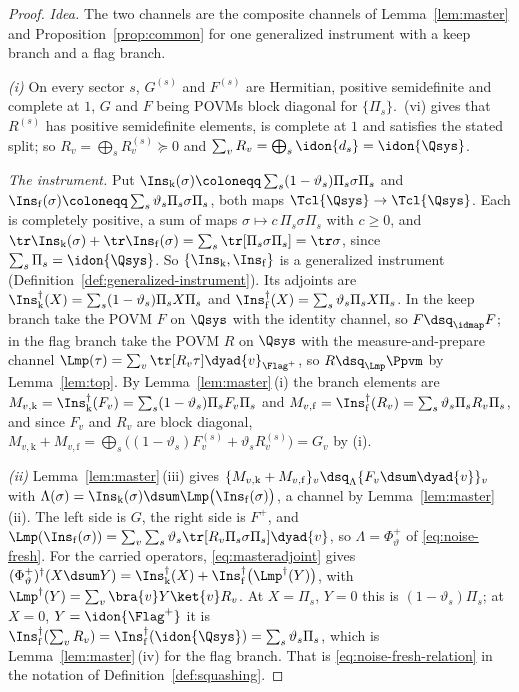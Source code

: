 \begin{proof}
\emph{Idea.} The two channels are the composite channels of
Lemma~\ref{lem:master} and Proposition~\ref{prop:common} for one generalized
instrument with a keep branch and a flag branch.

\emph{(i)} On every sector $s$, $G^{(s)}$ and $F^{(s)}$ are Hermitian, positive
semidefinite and complete at $1$, $G$ and $F$ being POVMs block diagonal for
$\{\Pi_s\}$. \,(vi) gives that $R^{(s)}$ has
positive semidefinite elements, is complete at $1$ and satisfies the stated
split; so $R_v=\bigoplus_sR^{(s)}_v\succeq0$ and
$\sum_vR_v=\bigoplus_s\idon{d_s}=\idon{\Qsys}$.

\emph{The instrument.} Put
$\Ins_{\mathrm{k}}(\sigma)\coloneqq\sum_s(1-\vartheta_s)\Pi_s\sigma\Pi_s$ and
$\Ins_{\mathrm{f}}(\sigma)\coloneqq\sum_s\vartheta_s\Pi_s\sigma\Pi_s$, both maps
$\Tcl{\Qsys}\to\Tcl{\Qsys}$. Each is completely positive, a sum of maps
$\sigma\mapsto c\,\Pi_s\sigma\Pi_s$ with $c\ge0$, and
$\tr\Ins_{\mathrm{k}}(\sigma)+\tr\Ins_{\mathrm{f}}(\sigma)
=\sum_s\tr[\Pi_s\sigma\Pi_s]=\tr\sigma$, since $\sum_s\Pi_s=\idon{\Qsys}$.
So $\{\Ins_{\mathrm{k}},\Ins_{\mathrm{f}}\}$ is a generalized instrument
(Definition~\ref{def:generalized-instrument}). Its adjoints are
$\Ins_{\mathrm{k}}^{\dagger}(X)=\sum_s(1-\vartheta_s)\Pi_sX\Pi_s$ and
$\Ins_{\mathrm{f}}^{\dagger}(X)=\sum_s\vartheta_s\Pi_sX\Pi_s$. In the keep branch
take the POVM $F$ on $\Qsys$ with the identity channel, so
$F\dsq_{\idmap}F$; in the flag branch take the POVM $R$ on $\Qsys$ with the
measure-and-prepare channel
$\Lmp(\tau)=\sum_v\tr[R_v\tau]\dyad{v}_{\Flag^{+}}$, so $R\dsq_{\Lmp}\Ppvm$ by
Lemma~\ref{lem:top}. By Lemma~\ref{lem:master}\,(i) the branch elements are
$M_{v,\mathrm{k}}=\Ins_{\mathrm{k}}^{\dagger}(F_v)=\sum_s(1-\vartheta_s)\Pi_sF_v\Pi_s$
and $M_{v,\mathrm{f}}=\Ins_{\mathrm{f}}^{\dagger}(R_v)=\sum_s\vartheta_s\Pi_sR_v\Pi_s$,
and since $F_v$ and $R_v$ are block diagonal,
$M_{v,\mathrm{k}}+M_{v,\mathrm{f}}
=\bigoplus_s\big((1-\vartheta_s)F^{(s)}_v+\vartheta_sR^{(s)}_v\big)=G_v$ by (i).

\emph{(ii)} Lemma~\ref{lem:master}\,(iii) gives
$\{M_{v,\mathrm{k}}+M_{v,\mathrm{f}}\}_v\dsq_{\Lambda}\{F_v\dsum\dyad{v}\}_v$
with $\Lambda(\sigma)=\Ins_{\mathrm{k}}(\sigma)\dsum\Lmp\big(\Ins_{\mathrm{f}}(\sigma)\big)$,
a channel by Lemma~\ref{lem:master}\,(ii). The left side is $G$, the right side
is $F^{+}$, and
$\Lmp(\Ins_{\mathrm{f}}(\sigma))=\sum_v\sum_s\vartheta_s\tr[R_v\Pi_s\sigma\Pi_s]\dyad{v}$,
so $\Lambda=\Phi^{+}_{\vartheta}$ of \eqref{eq:noise-fresh}. For the carried
operators, \eqref{eq:masteradjoint} gives
$(\Phi^{+}_{\vartheta})^{\dagger}(X\dsum Y)=\Ins_{\mathrm{k}}^{\dagger}(X)
+\Ins_{\mathrm{f}}^{\dagger}\big(\Lmp^{\dagger}(Y)\big)$, with
$\Lmp^{\dagger}(Y)=\sum_v\bra{v}Y\ket{v}R_v$. At $X=\Pi_s$, $Y=0$ this is
$(1-\vartheta_s)\Pi_s$; at $X=0$, $Y=\idon{\Flag^{+}}$ it is
$\Ins_{\mathrm{f}}^{\dagger}(\sum_vR_v)=\Ins_{\mathrm{f}}^{\dagger}(\idon{\Qsys})
=\sum_s\vartheta_s\Pi_s$, which is Lemma~\ref{lem:master}\,(iv) for the flag
branch. That is \eqref{eq:noise-fresh-relation} in the notation of
Definition~\ref{def:squashing}.


\end{proof}
